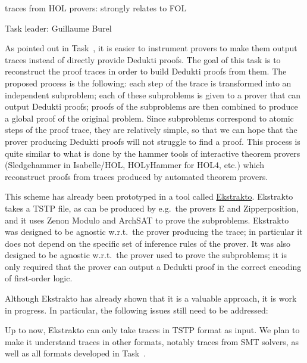 \begin{workpackage}[id=atpetc,wphases=0-48,type=RTD,
  short=ATPs etc.,%
  title={ATP, SAT, SMT, Model checkers},
  lead=Lie,
  LieRM=10]
\begin{tasklist}
\begin{task}[id=instrumenting, title=Instrumenting ATPs to produce
  traces]
traces from HOL provers: strongly relates to FOL

\end{task}


\begin{task}[id=tracetodedukti, title=Translate ATP traces into Dedukti]
  Task leader: Guillaume Burel

As pointed out in Task~, it is easier to
instrument provers to make them output traces instead of directly
provide Dedukti proofs. The goal of this task is to reconstruct the
proof traces in order to build Dedukti proofs from them. The proposed
process is the following: each step of the trace is transformed into
an independent subproblem; each of these subproblems is given to a
prover that can output Dedukti proofs; proofs of the subproblems are
then combined to produce a global proof of the original problem. Since
subproblems correspond to atomic steps of the proof trace, they are
relatively simple, so that we can hope that the prover producing
Dedukti proofs will not struggle to find a proof. This process is
quite similar to what is done by the hammer tools of interactive
theorem provers (Sledgehammer in Isabelle/HOL, HOLyHammer for HOL4, etc.)
which reconstruct proofs from traces produced by automated theorem
provers.

This scheme has already been prototyped in a tool called
\href{https://github.com/Deducteam/ekstrakto}{Ekstrakto}. Ekstrakto takes a TSTP
file, as can be produced by e.g.\ the provers E and Zipperposition, and it uses
Zenon Modulo and ArchSAT to prove the subproblems. Ekstrakto was designed to be
agnostic w.r.t.\ the prover producing the trace; in particular it does not
depend on the specific set of inference rules of the prover. It was also
designed to be agnostic w.r.t.\ the prover used to prove the subproblems; it is
only required that the prover can output a Dedukti proof in the correct encoding
of first-order logic.

Although Ekstrakto has already shown that it is a
valuable approach, it is work in progress. In particular, the
following issues still need to be addressed:

\begin{compactenum}
\item Up to now, Ekstrakto can only take traces in TSTP format as input. We plan
  to make it understand traces in other formats, notably traces from SMT
  solvers, as well as all formats developed in
  Task~.


\end{compactenum}
\end{task}
\end{tasklist}
\end{workpackage}
